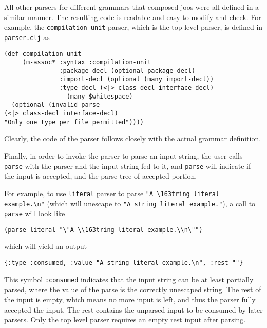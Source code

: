 \documentclass[12pt]{article}
\begin{document}
All other parsers for different grammars that composed joos were all defined in
a similar manner. The resulting code is readable and easy to modify and
check. For example, the \texttt{compilation-unit} parser, which is the top level
parser, is defined in \texttt{parser.clj} as

\begin{samepage}
\begin{verbatim}
(def compilation-unit
     (m-assoc* :syntax :compilation-unit
               :package-decl (optional package-decl)
               :import-decl (optional (many import-decl))
               :type-decl (<|> class-decl interface-decl)
               _ (many $whitespace)
_ (optional (invalid-parse
(<|> class-decl interface-decl)
"Only one type per file permitted"))))
\end{verbatim}
\end{samepage}

Clearly, the code of the parser follows closely with the actual grammar
definition.

Finally, in order to invoke the parser to parse an input string, the user calls
\texttt{parse} with the parser and the input string fed to it, and
\texttt{parse} will indicate if the input is accepted, and the parse tree of
accepted portion.

For example, to use \texttt{literal} parser to parse
\verb'"A \163tring literal example.\n"' (which will unescape to \texttt{"A
string literal example."}), a call to \texttt{parse} will look like

\begin{samepage}
\begin{verbatim}
(parse literal "\"A \\163tring literal example.\\n\"")
\end{verbatim}

\noindent which will yield an output

\begin{verbatim}
{:type :consumed, :value "A string literal example.\n", :rest ""}
\end{verbatim}
\end{samepage}

This symbol \texttt{:consumed} indicates that the input string can be at least
partially parsed, where the value of the parse is the correctly unescaped
string. The rest of the input is empty, which means no more input is left, and
thus the parser fully accepted the input. The rest contains the unparsed input
to be consumed by later parsers. Only the top level parser requires an empty
rest input after parsing.
\end{document}
